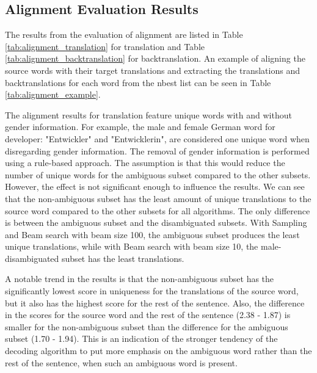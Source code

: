 \subsection{Alignment Evaluation Results}
\label{ch:Base_Experiment:Results:Alignment}

The results from the evaluation of alignment are listed in Table \ref{tab:alignment_translation} for translation and Table \ref{tab:alignment_backtranslation} for backtranslation. An example of aligning the source words with their target translations and extracting the translations and backtranslations for each word from the nbest list can be seen in Table \ref{tab:alignment_example}.


The alignment results for translation feature unique words with and without gender information. For example, the male and female German word for developer: "Entwickler" and "Entwicklerin", are considered one unique word when disregarding gender information. The removal of gender information is performed using a rule-based approach. The assumption is that this would reduce the number of unique words for the ambiguous subset compared to the other subsets. However, the effect is not significant enough to influence the results. We can see that the non-ambiguous subset has the least amount of unique translations to the source word compared to the other subsets for all algorithms. The only difference is between the ambiguous subset and the disambiguated subsets. With Sampling and Beam search with beam size 100, the ambiguous subset produces the least unique translations, while with Beam search with beam size 10, the male-disambiguated subset has the least translations.


A notable trend in the results is that the non-ambiguous subset has the significantly lowest score in uniqueness for the translations of the source word, but it also has the highest score for the rest of the sentence. Also, the difference in the scores for the source word and the rest of the sentence (2.38 - 1.87) is smaller for the non-ambiguous subset than the difference for the ambiguous subset (1.70 - 1.94). This is an indication of the stronger tendency of the decoding algorithm to put more emphasis on the ambiguous word rather than the rest of the sentence, when such an ambiguous word is present.

